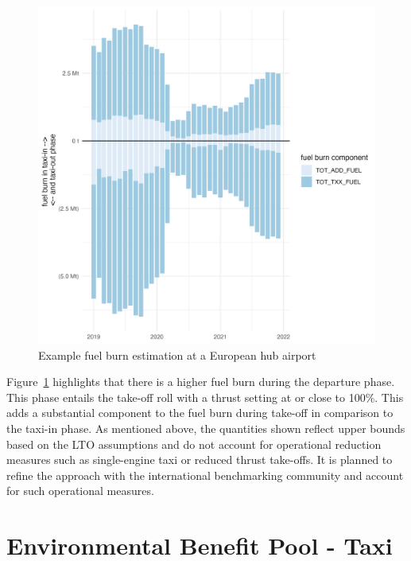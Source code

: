 \documentclass[
  a4paper,
  DIV=11,
  numbers=noendperiod]{scrreprt}
\begin{document}
\begin{figure}[h]

{\centering \includegraphics[width=7in,height=\textheight]{././figures/fuel_burn_EDDF.png}

}

\caption{\label{fig-example-fb}Example fuel burn estimation at a
European hub airport}

\end{figure}

Figure~\ref{fig-example-fb} highlights that there is a higher fuel burn
during the departure phase. This phase entails the take-off roll with a
thrust setting at or close to 100\%. This adds a substantial component
to the fuel burn during take-off in comparison to the taxi-in phase. As
mentioned above, the quantities shown reflect upper bounds based on the
LTO assumptions and do not account for operational reduction measures
such as single-engine taxi or reduced thrust take-offs. It is planned to
refine the approach with the international benchmarking community and
account for such operational measures.

\hypertarget{environmental-benefit-pool---taxi}{%
\section{Environmental Benefit Pool -
Taxi}\label{environmental-benefit-pool---taxi}}
\end{document}
